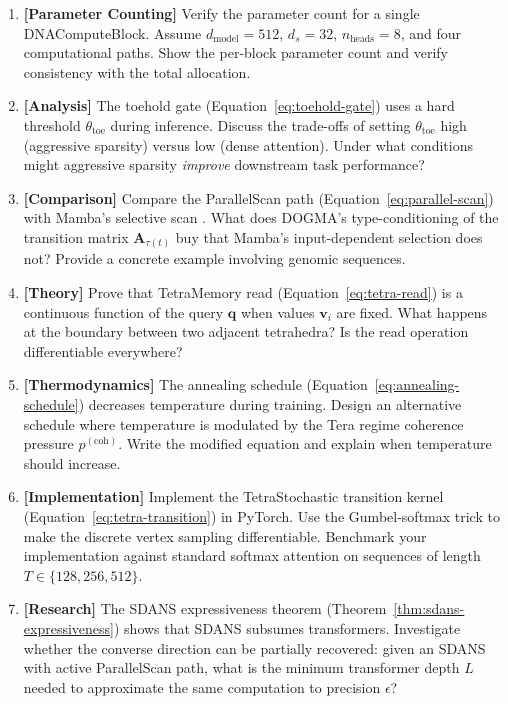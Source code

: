 \begin{enumerate}[label=\textbf{14.\arabic*.}, leftmargin=2.5em]

\item \textbf{[Parameter Counting]} Verify the parameter count for a single DNAComputeBlock. Assume $d_{\mathrm{model}} = 512$, $d_s = 32$, $n_{\mathrm{heads}} = 8$, and four computational paths. Show the per-block parameter count and verify consistency with the total allocation.

\item \textbf{[Analysis]} The toehold gate (Equation~\ref{eq:toehold-gate}) uses a hard threshold $\theta_{\mathrm{toe}}$ during inference. Discuss the trade-offs of setting $\theta_{\mathrm{toe}}$ high (aggressive sparsity) versus low (dense attention). Under what conditions might aggressive sparsity \emph{improve} downstream task performance?

\item \textbf{[Comparison]} Compare the ParallelScan path (Equation~\ref{eq:parallel-scan}) with Mamba's selective scan \citep{gu2023mamba}. What does DOGMA's type-conditioning of the transition matrix $\mathbf{A}_{\tau(t)}$ buy that Mamba's input-dependent selection does not? Provide a concrete example involving genomic sequences.

\item \textbf{[Theory]} Prove that TetraMemory read (Equation~\ref{eq:tetra-read}) is a continuous function of the query $\mathbf{q}$ when values $\mathbf{v}_i$ are fixed. What happens at the boundary between two adjacent tetrahedra? Is the read operation differentiable everywhere?

\item \textbf{[Thermodynamics]} The annealing schedule (Equation~\ref{eq:annealing-schedule}) decreases temperature during training. Design an alternative schedule where temperature is modulated by the Tera regime coherence pressure $p^{(\mathrm{coh})}$. Write the modified equation and explain when temperature should increase.

\item \textbf{[Implementation]} Implement the TetraStochastic transition kernel (Equation~\ref{eq:tetra-transition}) in PyTorch. Use the Gumbel-softmax trick to make the discrete vertex sampling differentiable. Benchmark your implementation against standard softmax attention on sequences of length $T \in \{128, 256, 512\}$.

\item \textbf{[Research]} The SDANS expressiveness theorem (Theorem~\ref{thm:sdans-expressiveness}) shows that SDANS subsumes transformers. Investigate whether the converse direction can be partially recovered: given an SDANS with active ParallelScan path, what is the minimum transformer depth $L$ needed to approximate the same computation to precision $\epsilon$?


\end{enumerate}
